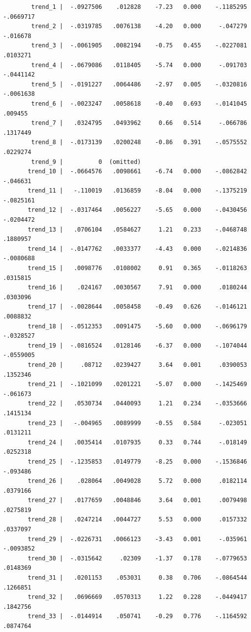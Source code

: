 \documentclass[
]{book}
\begin{document}
\begin{verbatim}
        trend_1 |  -.0927506    .012828    -7.23   0.000    -.1185295   -.0669717
        trend_2 |  -.0319785   .0076138    -4.20   0.000     -.047279    -.016678
        trend_3 |  -.0061905   .0082194    -0.75   0.455    -.0227081    .0103271
        trend_4 |  -.0679086   .0118405    -5.74   0.000     -.091703   -.0441142
        trend_5 |  -.0191227   .0064486    -2.97   0.005    -.0320816   -.0061638
        trend_6 |  -.0023247   .0058618    -0.40   0.693    -.0141045     .009455
        trend_7 |   .0324795   .0493962     0.66   0.514     -.066786    .1317449
        trend_8 |  -.0173139   .0200248    -0.86   0.391    -.0575552    .0229274
        trend_9 |          0  (omitted)
       trend_10 |  -.0664576   .0098661    -6.74   0.000    -.0862842    -.046631
       trend_11 |   -.110019   .0136859    -8.04   0.000    -.1375219   -.0825161
       trend_12 |  -.0317464   .0056227    -5.65   0.000    -.0430456   -.0204472
       trend_13 |   .0706104   .0584627     1.21   0.233    -.0468748    .1880957
       trend_14 |  -.0147762   .0033377    -4.43   0.000    -.0214836   -.0080688
       trend_15 |   .0098776   .0108002     0.91   0.365    -.0118263    .0315815
       trend_16 |    .024167   .0030567     7.91   0.000     .0180244    .0303096
       trend_17 |  -.0028644   .0058458    -0.49   0.626    -.0146121    .0088832
       trend_18 |  -.0512353   .0091475    -5.60   0.000    -.0696179   -.0328527
       trend_19 |  -.0816524   .0128146    -6.37   0.000    -.1074044   -.0559005
       trend_20 |     .08712   .0239427     3.64   0.001     .0390053    .1352346
       trend_21 |  -.1021099   .0201221    -5.07   0.000    -.1425469    -.061673
       trend_22 |   .0530734   .0440093     1.21   0.234    -.0353666    .1415134
       trend_23 |   -.004965   .0089999    -0.55   0.584     -.023051    .0131211
       trend_24 |   .0035414   .0107935     0.33   0.744     -.018149    .0252318
       trend_25 |  -.1235853   .0149779    -8.25   0.000    -.1536846    -.093486
       trend_26 |    .028064   .0049028     5.72   0.000     .0182114    .0379166
       trend_27 |   .0177659   .0048846     3.64   0.001     .0079498    .0275819
       trend_28 |   .0247214   .0044727     5.53   0.000     .0157332    .0337097
       trend_29 |  -.0226731   .0066123    -3.43   0.001     -.035961   -.0093852
       trend_30 |  -.0315642     .02309    -1.37   0.178    -.0779653    .0148369
       trend_31 |   .0201153    .053031     0.38   0.706    -.0864544    .1266851
       trend_32 |   .0696669   .0570313     1.22   0.228    -.0449417    .1842756
       trend_33 |  -.0144914    .050741    -0.29   0.776    -.1164592    .0874764

\end{verbatim}
\end{document}
